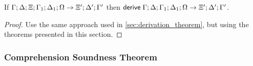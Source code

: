 \begin{theorem}
   If $\do \Gamma; \Delta; \Xi; \Gamma_1; \Delta_1; \Omega \rightarrow \Xi'; \Delta'; \Gamma'$ then $\mathsf{derive} \; \Gamma; \Delta; \Gamma_1; \Delta_1; \Omega \rightarrow \Xi'; \Delta'; \Gamma'$.
\end{theorem}

\begin{proof}
   Use the same approach used in \ref{sec:derivation_theorem}, but using the theorems presented in this section.
\end{proof}

\subsubsection{Comprehension Soundness Theorem}
